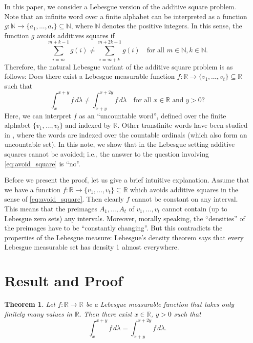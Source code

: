 \documentclass{amsart}
\theoremstyle{plain}
\newtheorem{theorem}{Theorem}
\newcommand{\N}{\mathbb{N}}
\newcommand{\R}{\mathbb{R}}
\begin{document}
In this paper, we consider a Lebesgue version of the additive square problem. Note that an infinite word over a finite alphabet can be interpreted as a function $g \colon \N \to \{a_1, \ldots, a_t\} \subseteq \N$, where $\N$ denotes the positive integers. In this sense, the function $g$ avoids additives squares if 
\[
    \sum_{i = m}^{m+k-1} g(i)
    \neq \sum_{i = m+k}^{m+2k-1} g(i)
    \quad \text{for all } m \in \N, k \in \N.
\]
Therefore, the natural Lebesgue variant of the additive square problem is as follows: 
Does there exist a Lebesgue measurable function $f\colon \R \to \{v_1, \ldots, v_t\} \subseteq \R$ such that
\begin{equation}\label{eq:avoid_square}
    \int_x^{x+y} f\, d \lambda  
    \neq \int_{x+y}^{x+2y} f\, d \lambda
    \quad \text{for all } x \in \R \text{ and } y >0?
\end{equation}
Here, we can interpret $f$ as an ``uncountable word'', defined over the finite alphabet $\{v_1, \ldots, v_t\}$ and indexed by $\R$. Other transfinite words have been studied in 
\cite{BoassonCarton2020, CartonChoffrut2001}, where the words are indexed over the countable ordinals (which also form an uncountable set).
In this note, we show that in the Lebesgue setting additive squares cannot be avoided; i.e., 
the answer to the question involving \eqref{eq:avoid_square} is ``no''.

\medskip

Before we present the proof, let us give a brief intuitive explanation.
Assume that we have a function $f\colon \R \to \{v_1, \ldots, v_t\} \subseteq \R$ which avoids additive squares in the sense of \eqref{eq:avoid_square}.
Then clearly $f$ cannot be constant on any interval. This means that the preimages $A_1, \ldots , A_t$ of $v_1, \ldots, v_t$ cannot contain (up to Lebesgue zero sets) any intervals. Moreover, morally speaking, the ``densities'' of the preimages have to be ``constantly changing''. But this 
contradicts the properties of the Lebesgue measure: Lebesgue's density theorem says that every Lebesgue measurable set has density 1 almost everywhere.





\section{Result and Proof}

\begin{theorem}\label{thm:lebSquares}
Let $f\colon \R \to \R$ be a Lebesgue measurable function that
takes only finitely many values in $\R$. Then there exist $x \in \R$, $y>0$ such that 
\[
    \int_x^{x+y} f\, d \lambda   
    = \int_{x+y}^{x+2y} f\, d \lambda.
\]
\end{theorem}
\end{document}
